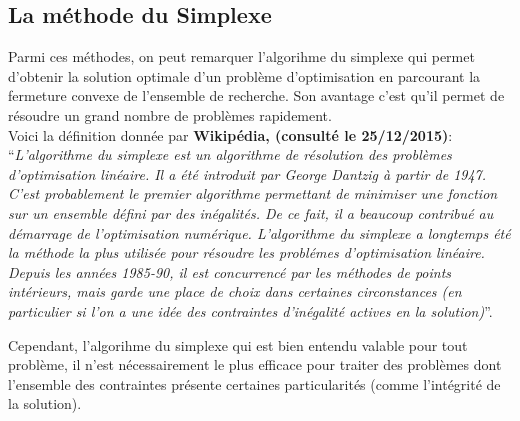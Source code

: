 \documentclass[a4paper,11pt,oneside]{report}
\theoremstyle{plain}
\newcommand{\0}{/ \! \! \! 0}
\theoremstyle{plain}
\begin{document}
\subsection{La m\'ethode du Simplexe}\label{simplexe}
 Parmi ces m\'ethodes, on peut remarquer l'algorihme du simplexe qui permet d'obtenir la solution optimale d'un probl\`eme d'optimisation en parcourant la 
 fermeture convexe de l'ensemble de recherche. Son avantage c'est qu'il permet de r\'esoudre un grand nombre de probl\`emes rapidement.\\\vspace{0.4cm}
 Voici la d\'efinition donn\'ee par {\bf Wikip\'edia, (consult\'e le 25/12/2015)}:\\
   ``{\it L'algorithme du simplexe est un algorithme de r\'esolution des probl\`emes d'optimisation lin\'eaire. Il a \'et\'e introduit par George Dantzig
 \`a partir de 1947. C'est probablement le premier algorithme permettant de minimiser une fonction sur un ensemble d\'efini par des in\'egalit\'es. 
De ce fait, il a beaucoup contribu\'e au d\'emarrage de l'optimisation num\'erique. L'algorithme du simplexe a longtemps \'et\'e la m\'ethode la plus utilis\'ee
 pour r\'esoudre les probl\'emes d'optimisation lin\'eaire. Depuis les ann\'ees 1985-90, il est concurrenc\'e par les m\'ethodes de points int\'erieurs, mais garde 
 une place de choix dans certaines circonstances (en particulier si l'on a une id\'ee des contraintes d'in\'egalit\'e actives en la solution)}''.
 \vspace{0.4cm}
 
                                                                                  
 Cependant, l'algorihme du simplexe qui est bien entendu valable pour tout probl\`eme, il n'est n\'ecessairement le plus efficace pour traiter des
 probl\`emes dont l'ensemble des contraintes pr\'esente certaines particularit\'es (comme l'int\'egrit\'e de la solution).
\end{document}
